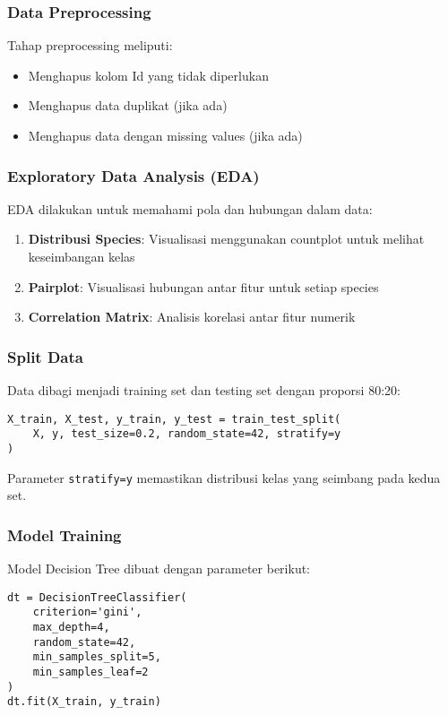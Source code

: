 \documentclass[11pt,a4paper]{article}
\begin{document}
\subsubsection{Data Preprocessing}
Tahap preprocessing meliputi:
\begin{itemize}
    \item Menghapus kolom Id yang tidak diperlukan
    \item Menghapus data duplikat (jika ada)
    \item Menghapus data dengan missing values (jika ada)
\end{itemize}

\subsubsection{Exploratory Data Analysis (EDA)}
EDA dilakukan untuk memahami pola dan hubungan dalam data:
\begin{enumerate}
    \item \textbf{Distribusi Species}: Visualisasi menggunakan countplot untuk melihat keseimbangan kelas
    \item \textbf{Pairplot}: Visualisasi hubungan antar fitur untuk setiap species
    \item \textbf{Correlation Matrix}: Analisis korelasi antar fitur numerik
\end{enumerate}

\subsubsection{Split Data}
Data dibagi menjadi training set dan testing set dengan proporsi 80:20:
\begin{lstlisting}
X_train, X_test, y_train, y_test = train_test_split(
    X, y, test_size=0.2, random_state=42, stratify=y
)
\end{lstlisting}

Parameter \texttt{stratify=y} memastikan distribusi kelas yang seimbang pada kedua set.

\subsubsection{Model Training}
Model Decision Tree dibuat dengan parameter berikut:
\begin{lstlisting}
dt = DecisionTreeClassifier(
    criterion='gini',
    max_depth=4,
    random_state=42,
    min_samples_split=5,
    min_samples_leaf=2
)
dt.fit(X_train, y_train)
\end{lstlisting}
\end{document}
